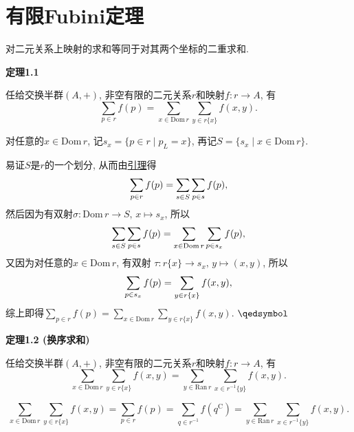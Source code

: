 \documentclass[UTF8]{ctexart}
\begin{document}
\setlength{\abovedisplayskip}{1pt}
\setlength{\belowdisplayskip}{1pt}

\section{有限Fubini定理}

对二元关系上映射的求和等同于对其两个坐标的二重求和.

\vspace{10pt}

\hypertarget{sec:定理1.1}{}
\noindent\textbf{定理1.1}

任给交换半群$(A,+)$, 非空有限的二元关系$r$和映射$f:r\to A$, 有
\vspace{3pt}
\[
    \sum_{p\in r}f(p)=\sum_{x\in\mathrm{Dom}\,r}\sum_{y\in r\{x\}}f(x,y).
\]


对任意的$x\in\mathrm{Dom}\,r$, 记$s_x=\{p\in r\mid p_L=x\}$,
再记$S=\{s_x\mid x\in\mathrm{Dom}\,r\}$.

易证$S$是$r$的一个划分, 从而由\href{02 无序求和#nameddest=sec:定理1.3}{引理}得
\[
    \sum_{p\in r}f(p)=\sum_{s\in S}\sum_{p\in s}f(p),\\[3pt]
\]
然后因为有双射$\sigma:\mathrm{Dom}\,r\to S,\,x\mapsto s_x$, 所以
\vspace{3pt}
\[
    \sum_{s\in S}\sum_{p\in s}f(p)=
    \sum_{x\in\mathrm{Dom}\,r}\sum_{p\in s_x}f(p),\\[3pt]
\]
又因为对任意的$x\in\mathrm{Dom}\,r$, 有双射
$\tau:r\{x\}\to s_x,\,y\mapsto(x,y)$, 所以
\vspace{3pt}
\[
    \sum_{p\in s_x}f(p)=\sum_{y\in r\{x\}}f(x,y),\\[3pt]
\]
综上即得$\displaystyle\sum_{p\in r}f(p)=
\sum_{x\in\mathrm{Dom}\,r}\sum_{y\in r\{x\}}f(x,y)$. \hfill $\qedsymbol$

\vspace{13pt}

\hypertarget{sec:定理1.2}{}
\noindent\textbf{定理1.2 (换序求和)}

任给交换半群$(A,+)$, 非空有限的二元关系$r$和映射$f:r\to A$, 有
\vspace{3pt}
\[
    \sum_{x\in\mathrm{Dom}\,r}\sum_{y\in r\{x\}}f(x,y)=
    \sum_{y\in\mathrm{Ran}\,r}\sum_{x\in r^{-1}\{y\}}f(x,y).
\]


\vspace{-9pt}
\begin{equation*}
    \sum_{x\in\mathrm{Dom}\,r}\sum_{y\in r\{x\}}f(x,y)=
    \sum_{p\in r}f(p)=\sum_{q\in r^{-1}}f(q^{\mathrm{C}})=
    \sum_{y\in\mathrm{Ran}\,r}\sum_{x\in r^{-1}\{y\}}f(x,y).
\tag*{\qedsymbol}\end{equation*}
\end{document}
